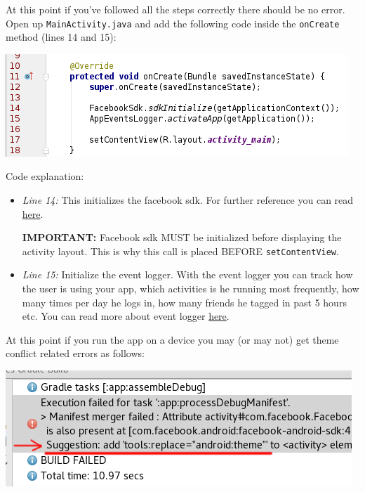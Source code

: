 At this point if you've followed all the steps correctly there should be no error. Open up \texttt{MainActivity.java} and add the following code inside the \texttt{onCreate} method (lines 14 and 15):

\begin{center}
	\includegraphics[scale=\SourceCodeScale]{chapters/ch12/images/16}
\end{center}

Code explanation:
\begin{itemize}
	\item \textit{Line 14:} This initializes the facebook sdk. For further reference you can read \href{https://developers.facebook.com/docs/reference/android/current/class/FacebookSdk/}{here}.
	
	\textbf{IMPORTANT:} Facebook sdk MUST be initialized before displaying the activity layout. This is why this call is placed BEFORE \texttt{setContentView}.
	
	\item \textit{Line 15:} Initialize the event logger. With the event logger you can track how the user is using your app, which activities is he running most frequently, how many times per day he logs in, how many friends he tagged in past 5 hours etc. You can read more about event logger \href{https://developers.facebook.com/docs/reference/android/current/class/AppEventsLogger/}{here}.
\end{itemize}

At this point if you run the app on a device you may (or may not) get theme conflict related errors as follows:

\begin{center}
	\includegraphics[scale=\SourceCodeScale]{chapters/ch12/images/17}
\end{center}

